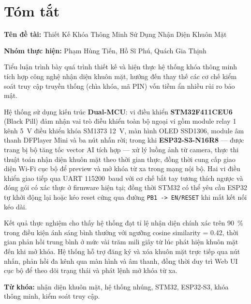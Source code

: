 \chapter*{Tóm tắt}

\begin{singlespace}
\noindent\textbf{Tên đề tài:} Thiết Kế Khóa Thông Minh Sử Dụng Nhận Diện Khuôn Mặt

\medskip
\noindent\textbf{Nhóm thực hiện:} Phạm Hùng Tiến, Hồ Sĩ Phú, Quách Gia Thịnh
\end{singlespace}

\bigskip

Tiểu luận trình bày quá trình thiết kế và hiện thực hệ thống khóa thông minh tích hợp công nghệ nhận diện khuôn mặt, hướng đến thay thế các cơ chế kiểm soát truy cập truyền thống (chìa khóa, mã PIN) vốn tiềm ẩn nhiều rủi ro bảo mật.

Hệ thống sử dụng kiến trúc \textbf{Dual-MCU}: vi điều khiển \textbf{STM32F411CEU6} (Black Pill) đảm nhận vai trò điều khiển toàn bộ ngoại vi gồm module relay 1 kênh 5~V điều khiển khóa SM1373 12~V, màn hình OLED SSD1306, module âm thanh DFPlayer Mini và ba nút nhấn rời; trong khi \textbf{ESP32-S3-N16R8} --- được trang bị bộ tăng tốc vector AI tích hợp --- xử lý luồng ảnh từ camera, thực thi thuật toán nhận diện khuôn mặt theo thời gian thực, đồng thời cung cấp giao diện Wi-Fi cục bộ để preview và mở khóa từ xa trong mạng nội bộ. Hai vi điều khiển giao tiếp qua UART \SI{115200}{baud} với cơ chế bắt tay tương thích ngược và đóng gói có xác thực ở firmware hiện tại; đồng thời STM32 có thể yêu cầu ESP32 tự khởi động lại hoặc kéo reset cứng qua đường \texttt{PB1 -> EN/RESET} khi mất kết nối kéo dài.

Kết quả thực nghiệm cho thấy hệ thống đạt tỉ lệ nhận diện chính xác trên \SI{90}{\percent} trong điều kiện ánh sáng bình thường với ngưỡng cosine similarity = 0.42, thời gian phản hồi trung bình ở mức vài trăm mili giây từ lúc phát hiện khuôn mặt đến khi mở khóa. Hệ thống hỗ trợ đăng ký và xóa khuôn mặt trực tiếp qua nút nhấn, phản hồi đa kênh qua màn hình và âm thanh, đồng thời duy trì Web UI cục bộ để theo dõi trạng thái và phát lệnh mở khóa từ xa.

\medskip
\noindent\textbf{Từ khóa:} nhận diện khuôn mặt, hệ thống nhúng, STM32, ESP32-S3, khóa thông minh, kiểm soát truy cập.
